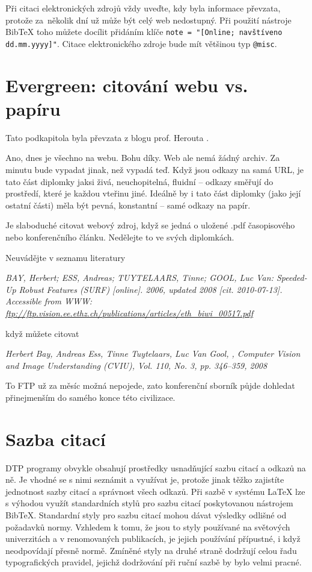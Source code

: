 Při citaci elektronických zdrojů vždy uveďte, kdy byla informace převzata, protože za~několik dní už může být celý web nedostupný. Při použití nástroje BibTeX toho můžete docílit přidáním klíče \verb|note = "[Online; navštíveno dd.mm.yyyy]"|. Citace elektronického zdroje bude mít většinou typ \verb|@misc|.

\section{Evergreen: citování webu vs. papíru}

Tato podkapitola byla převzata z blogu prof. Herouta \cite{Herout}.

Ano, dnes je všechno na webu. Bohu díky. Web ale nemá žádný archiv. Za minutu bude vypadat jinak, než vypadá teď. Když jsou odkazy na  samá URL, je tato část diplomky jaksi živá, neuchopitelná, fluidní -- odkazy směřují do prostředí, které je každou vteřinu jiné. Ideálně by i tato část diplomky (jako její ostatní části) měla být pevná, konstantní -- samé odkazy na papír.

Je slaboduché citovat webový zdroj, když se jedná o uložené .pdf časopisového nebo konferenčního článku. Nedělejte to ve svých diplomkách.
\bigskip

\noindent Neuvádějte v seznamu literatury

\noindent \it BAY, Herbert; ESS, Andreas; TUYTELAARS, Tinne; GOOL, Luc Van: Speeded-Up Robust Features (SURF) [online]. 2006, updated 2008 [cit. 2010-07-13]. Accessible from WWW: \url{ftp://ftp.vision.ee.ethz.ch/publications/articles/eth\_biwi\_00517.pdf}
\bigskip
\rm

\noindent když můžete citovat

\noindent \it Herbert Bay, Andreas Ess, Tinne Tuytelaars, Luc Van Gool, , Computer Vision and Image Understanding (CVIU), Vol. 110, No. 3, pp. 346–359, 2008
\bigskip
\rm

To FTP už za měsíc možná nepojede, zato konferenční sborník půjde dohledat přinejmenším do samého konce této civilizace.

\section{Sazba citací}

DTP programy obvykle obsahují prostředky usnadňující sazbu citací a odkazů na ně. Je vhodné se s nimi seznámit a využívat je, protože jinak těžko zajistíte jednotnost sazby citací a správnost všech odkazů. Při sazbě v systému \LaTeX{} lze s výhodou využít standardních stylů pro sazbu citací poskytovanou nástrojem BibTeX. Standardní styly pro sazbu citací mohou dávat výsledky odlišné od požadavků normy. Vzhledem k tomu, že jsou to styly používané na světových univerzitách a v renomovaných publikacích, je jejich používání přípustné, i když neodpovídají přesně normě. Zmíněné styly na druhé straně dodržují celou řadu typografických pravidel, jejichž dodržování při ruční sazbě by bylo velmi pracné.


